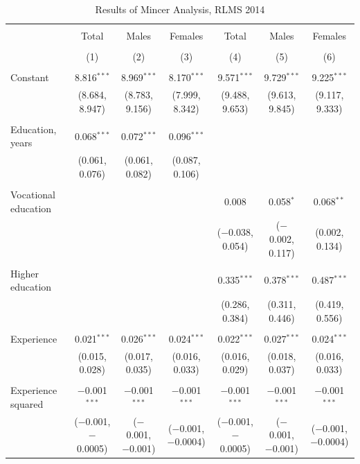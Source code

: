 \documentclass[alpha-refs]{wiley-article-01g}
\begin{document}
\begin{landscape}

\fontsize{9}{11}
\selectfont

\begin{table}[!htbp] \centering 
\renewcommand{\arraystretch}{1.0}
  \caption{Results of Mincer Analysis, RLMS 2014} 
  \label{} 
\begin{tabular}{@{\extracolsep{5pt}}lcccccc} 
\\[-1.8ex]\hline 
\hline \\[-1.8ex] 
 & Total & Males & Females & Total & Males & Females \\ 
\\[-1.8ex] & (1) & (2) & (3) & (4) & (5) & (6)\\ 
\hline \\[-1.8ex] 
 Constant & 8.816$^{***}$ & 8.969$^{***}$ & 8.170$^{***}$ & 9.571$^{***}$ & 9.729$^{***}$ & 9.225$^{***}$ \\ 
  & (8.684, 8.947) & (8.783, 9.156) & (7.999, 8.342) & (9.488, 9.653) & (9.613, 9.845) & (9.117, 9.333) \\ 
  & & & & & & \\ 
 Education, years & 0.068$^{***}$ & 0.072$^{***}$ & 0.096$^{***}$ &  &  &  \\ 
  & (0.061, 0.076) & (0.061, 0.082) & (0.087, 0.106) &  &  &  \\ 
  & & & & & & \\ 
 Vocational education &  &  &  & 0.008 & 0.058$^{*}$ & 0.068$^{**}$ \\ 
  &  &  &  & ($-$0.038, 0.054) & ($-$0.002, 0.117) & (0.002, 0.134) \\ 
  & & & & & & \\ 
 Higher education &  &  &  & 0.335$^{***}$ & 0.378$^{***}$ & 0.487$^{***}$ \\ 
  &  &  &  & (0.286, 0.384) & (0.311, 0.446) & (0.419, 0.556) \\ 
  & & & & & & \\ 
 Experience & 0.021$^{***}$ & 0.026$^{***}$ & 0.024$^{***}$ & 0.022$^{***}$ & 0.027$^{***}$ & 0.024$^{***}$ \\ 
  & (0.015, 0.028) & (0.017, 0.035) & (0.016, 0.033) & (0.016, 0.029) & (0.018, 0.037) & (0.016, 0.033) \\ 
  & & & & & & \\ 
 Experience squared & $-$0.001$^{***}$ & $-$0.001$^{***}$ & $-$0.001$^{***}$ & $-$0.001$^{***}$ & $-$0.001$^{***}$ & $-$0.001$^{***}$ \\ 
  & ($-$0.001, $-$0.0005) & ($-$0.001, $-$0.001) & ($-$0.001, $-$0.0004) & ($-$0.001, $-$0.0005) & ($-$0.001, $-$0.001) & ($-$0.001, $-$0.0004) \\ 

\end{tabular}
\end{table}
\end{landscape}
\end{document}
